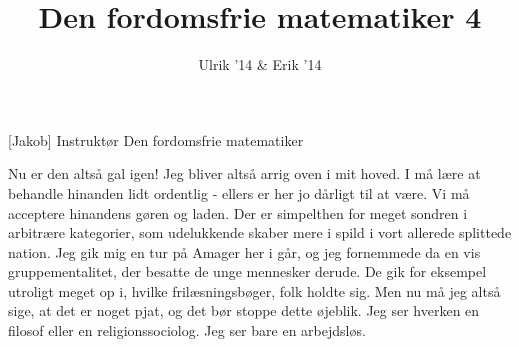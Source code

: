 \documentclass[a4paper,11pt]{article}
\title{Den fordomsfrie matematiker 4}
\author{Ulrik '14 \& Erik '14}
\begin{document}
\maketitle

\begin{roles}
[Jakob] Instruktør
 Den fordomsfrie matematiker
\end{roles}



\begin{sketch}


 Nu er den altså gal igen! Jeg bliver altså arrig oven i mit hoved. I må lære at behandle hinanden lidt ordentlig - ellers er her jo dårligt til at være. Vi må acceptere hinandens gøren og laden. Der er simpelthen for meget sondren i arbitrære kategorier, som udelukkende skaber mere i spild i vort allerede splittede nation. Jeg gik mig en tur på Amager her i går, og jeg fornemmede da en vis gruppementalitet, der besatte de unge mennesker derude. De gik for eksempel utroligt meget op i, hvilke frilæsningsbøger, folk holdte sig. Men nu må jeg altså sige, at det er noget pjat, og det bør stoppe dette øjeblik. Jeg ser hverken en filosof eller en religionssociolog. Jeg ser bare en arbejdsløs.



\end{sketch}
\end{document}
